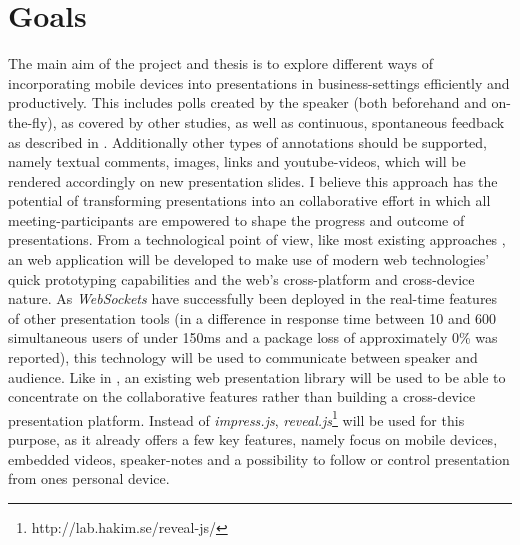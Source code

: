 \section{Goals}
The main aim of the project and thesis is to explore different ways of incorporating mobile devices into presentations in business-settings efficiently and productively. This includes polls created by the speaker (both beforehand and on-the-fly), as covered by other studies, as well as continuous, spontaneous feedback as described in \cite{Teevan:MobileFeedbackDuringPresentation}. Additionally other types of annotations should be supported, namely textual comments, images, links and youtube-videos, which will be rendered accordingly on new presentation slides. I believe this approach has the potential of transforming presentations into an collaborative effort in which all meeting-participants are empowered to shape the progress and outcome of presentations. From a technological point of view, like most existing approaches \cite{Bry:Backstage, Cheng:TreebasedOnlinePresentations, Esponda:ElectronicVotingOnTheFly, Inoue:RealTimeQuestionnaire, Teevan:MobileFeedbackDuringPresentation, Triglianos:InteractiveWebPresentationsImpress}, an web application will be developed to make use of modern web technologies' quick prototyping capabilities and the web's cross-platform and cross-device nature. As \emph{WebSockets} have successfully been deployed in the real-time features of other presentation tools \cite{Inoue:RealTimeQuestionnaire, Triglianos:InteractiveWebPresentationsImpress} (in \cite{Inoue:RealTimeQuestionnaire} a difference in response time between 10 and 600 simultaneous users of under 150ms and a package loss of approximately 0\% was reported), this technology will be used to communicate between speaker and audience. Like in \cite{Triglianos:InteractiveWebPresentationsImpress}, an existing web presentation library will be used to be able to concentrate on the collaborative features rather than building a cross-device presentation platform. Instead of \emph{impress.js}, \emph{reveal.js}\footnote{http://lab.hakim.se/reveal-js/} will be used for this purpose, as it already offers a few key features, namely focus on mobile devices, embedded videos, speaker-notes and a possibility to follow or control presentation from ones personal device.